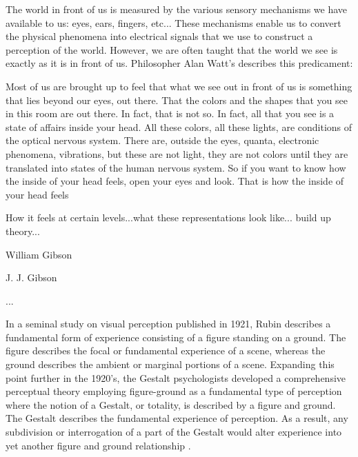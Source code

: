 \documentclass[a4paper,10pt,final]{ThesisStyle}
\begin{document}
The world in front of us is measured by the various sensory mechanisms we have available to us: eyes, ears, fingers, etc... These mechanisms enable us to convert the physical phenomena into electrical signals that we use to construct a perception of the world.  However, we are often taught that the world we see is exactly as it is in front of us.  Philosopher Alan Watt's describes this predicament:
\begin{quotationb}
Most of us are brought up to feel that what we see out in front of us is something that lies beyond our eyes, out there. That the colors and the shapes that you see in this room are out there. In fact, that is not so. In fact, all that you see is a state of affairs inside your head. All these colors, all these lights, are conditions of the optical nervous system. There are, outside the eyes, quanta, electronic phenomena, vibrations, but these are not light, they are not colors until they are translated into states of the human nervous system. So if you want to know how the inside of your head feels, open your eyes and look. That is how the inside of your head feels\\
\end{quotationb}
How it feels at certain levels...what these representations look like... build up theory... 


William Gibson

J. J. Gibson

... 

In a seminal study on visual perception published in 1921, Rubin describes a fundamental form of experience consisting of a figure standing on a ground.  The figure describes the focal or fundamental experience of a scene, whereas the ground describes the ambient or marginal portions of a scene.  Expanding this point further in the 1920's, the Gestalt psychologists developed a comprehensive perceptual theory employing figure-ground as a fundamental type of perception where the notion of a Gestalt, or totality, is described by a figure and ground.  The Gestalt describes the fundamental experience of perception.  As a result, any subdivision or interrogation of a part of the Gestalt would alter experience into yet another figure and ground relationship \cite{Wever1927}.  
\end{document}
